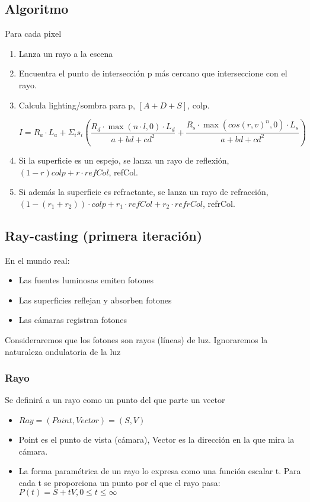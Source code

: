 \subsection{Algoritmo}
Para cada pixel
\begin{enumerate}
    \item Lanza un rayo a la escena
    \item Encuentra el punto de intersección p más cercano que interseccione con el rayo.
    \item Calcula lighting/sombra para p, $[A+D+S]$, colp.
        
    $$I= R_a \cdot L_a + \Sigma_i s_i \left( \frac {R_d \cdot \max (n\cdot l,0) \cdot L_d}{a+bd+cd^2} + \frac {R_s \cdot \max (cos(r,v)^n,0) \cdot L_s}{a+bd+cd^2} \right)$$
    \item Si la superficie es un espejo, se lanza un rayo de reflexión, $(1-r)colp+ r\cdot refCol$, refCol.
    \item Si además la superficie es refractante, se lanza un rayo de refracción, $(1-(r_1+r_2))\cdot colp + r_1\cdot refCol +r_2\cdot refrCol$, refrCol.
\end{enumerate}
\subsection{Ray-casting (primera iteración)}
En el mundo real:
\begin{itemize}
    \item Las fuentes luminosas emiten fotones
    \item Las superficies reflejan y absorben fotones
    \item Las cámaras registran fotones
\end{itemize}

Consideraremos que los fotones son rayos (líneas) de luz. Ignoraremos la naturaleza ondulatoria de la luz

\subsubsection{Rayo}
Se definirá a un rayo como un punto del que parte un vector
\begin{itemize}
    \item $Ray = (Point, Vector) = (S, V)$
    \item Point es el punto de vista (cámara), Vector es la dirección en la que mira la cámara.
    \item La forma paramétrica de un rayo lo expresa como una función escalar t. Para cada t se proporciona un punto por el que el rayo pasa: $P(t)=S+tV, 0 \leq t \leq \infty$
\end{itemize}

